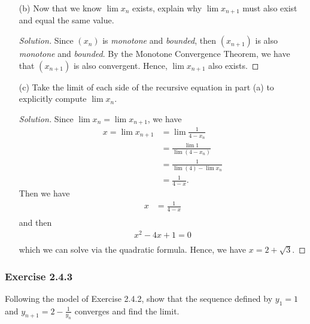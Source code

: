 \begin{enumerate}
\begin{proof}
        \end{proof}
    \item[(b)] Now that we know \( \lim x_n \) exists, explain why \( \lim x_{n+1}\) must also exist and equal the same value.
        \begin{proof}[Solution]
            Since \( (x_n) \) is \textit{monotone} and \textit{bounded}, then \( (x_{n+1})\) is also \textit{monotone} and \textit{bounded}. By the Monotone Convergence Theorem, we have that \( (x_{n+1})\) is also convergent. Hence, \( \lim x_{n+1}\) also exists.    
        \end{proof}
    \item[(c)] Take the limit of each side of the recursive equation in part (a) to explicitly compute \( \lim x_n \). 
        \begin{proof}[Solution]
            Since \( \lim x_n = \lim x_{n+1}\), we have
            \begin{align*}
                x = \lim x_{n+1} &= \lim \frac{1}{4-x_n}  \\ 
                                 &= \frac{ \lim 1 }{ \lim (4 - x_n ) } \\ 
                                 &= \frac{1}{ \lim (4) - \lim x_n} \\
                                 &= \frac{1}{4 - x} \tag{ \( \lim x_n = x \)}.
            \end{align*}
            Then we have 
            \begin{align*}
                x &= \frac{1}{4-x} \\
            \end{align*}
            and then 
            \begin{align*}
                x^2 - 4x + 1 = 0 \\ 
            \end{align*}
            which we can solve via the quadratic formula. Hence, we have \( x = 2 + \sqrt{3}\). 
        \end{proof}

\end{enumerate}

\subsubsection{Exercise 2.4.3}
Following the model of Exercise 2.4.2, show that the sequence defined by \( y_1 = 1 \) and \( y_{n+1} = 2 - \frac{1}{y_n}\) converges and find the limit.

